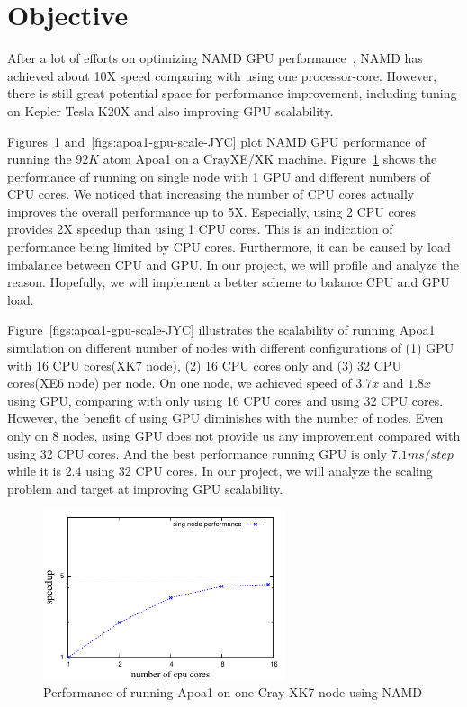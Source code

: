 \documentclass[11pt,onecolumn]{article}
\begin{document}
\section{Objective}
After a lot of efforts on optimizing NAMD GPU performance~\cite{phillips_stone_namd_cuda}, NAMD has achieved 
about 10X speed comparing with using one processor-core. However, there is still great
potential space for performance improvement, including tuning on Kepler Tesla K20X and
also improving GPU scalability.

Figures~\ref{figs:apoa1-gpu-singlenode-JYC} and~\ref{figs:apoa1-gpu-scale-JYC}
plot NAMD GPU performance of running the $92K$ atom Apoa1 on a CrayXE/XK machine.
Figure~\ref{figs:apoa1-gpu-singlenode-JYC} shows the performance of running on 
single node with 1 GPU and different numbers of CPU cores. We noticed that increasing
the number of CPU cores actually improves the overall performance up to 5X. Especially, 
using 2 CPU cores provides 2X speedup than using 1 CPU cores.
This is an indication of performance being limited by CPU cores. Furthermore, 
it can be caused by load imbalance between CPU and GPU. In our project, we will profile
and analyze the reason. Hopefully, we will implement a better scheme to balance CPU and GPU load.

Figure~\ref{figs:apoa1-gpu-scale-JYC} illustrates the scalability of 
running Apoa1 simulation on different number of nodes with different configurations of 
(1) GPU with 16 CPU cores(XK7 node), (2) 16 CPU cores only and (3) 32 CPU cores(XE6 node) per node.
On one node, we achieved speed of $3.7x$ and $1.8x$ using GPU, comparing with only using 16 CPU cores
and using 32 CPU cores. However, the benefit of using GPU diminishes with the number of nodes.
Even only on 8 nodes, using GPU does not provide us any improvement compared with using 32 CPU cores.
And the best performance running GPU is only $7.1ms/step$ while it is $2.4$ using 32 CPU cores.
In our project, we will analyze the scaling problem and target at improving GPU scalability.


\begin{figure}[h]
\centering
\includegraphics[width=2.8in]{figs/gpu-singlenode}
\caption{Performance of running Apoa1 on one Cray XK7 node using NAMD}
\label{figs:apoa1-gpu-singlenode-JYC}
\vspace{-0.2cm}
\end{figure}
\end{document}
